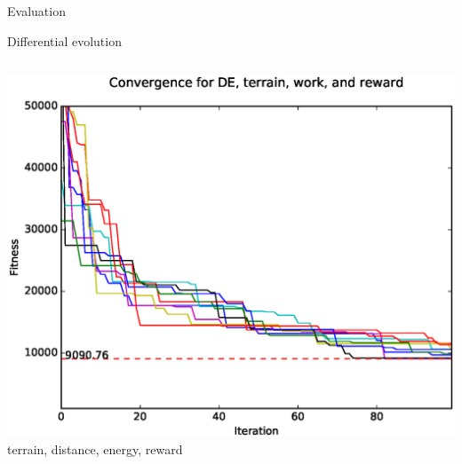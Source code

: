 \documentclass[9pt]{beamer}
\begin{document}
\begin{frame}{Evaluation}
\begin{block}{Differential evolution}
\begin{columns}
\begin{column}{0.5\textwidth}
\begin{center}
                    \includegraphics[width=\textwidth,trim={.75cm .75cm 0cm 1cm},clip]{img/conv_DE_b.eps}
                    \linebreak
                    terrain, distance, energy, reward
                \end{center}
            \end{column}
        \end{columns}
    \end{block}
\end{frame}
\end{document}
